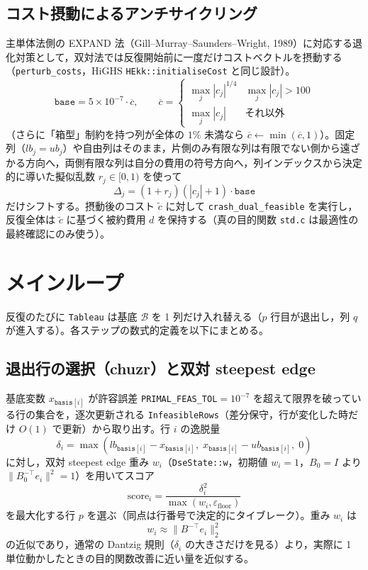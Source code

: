 \documentclass[11pt,a4paper]{ltjsarticle}
\newcommand{\code}[1]{\texttt{#1}}
\begin{document}
\subsection{コスト摂動によるアンチサイクリング}

主単体法側の EXPAND 法（Gill--Murray--Saunders--Wright, 1989）に対応する退化対策として，双対法では反復開始前に一度だけコストベクトルを摂動する（\code{perturb\_costs}，HiGHS \code{HEkk::initialiseCost} と同じ設計）。
\[
  \code{base} = 5\times 10^{-7}\cdot \overline{c}, \qquad
  \overline{c} = \begin{cases}\max_j|c_j|^{1/4} & \max_j|c_j| > 100\\ \max_j|c_j| & \text{それ以外}\end{cases}
\]
（さらに「箱型」制約を持つ列が全体の $1\%$ 未満なら $\overline c \leftarrow \min(\overline c, 1)$）。固定列（$lb_j=ub_j$）や自由列はそのまま，片側のみ有限な列は有限でない側から遠ざかる方向へ，両側有限な列は自分の費用の符号方向へ，列インデックスから決定的に導いた擬似乱数 $r_j \in [0,1)$ を使って
\[
  \Delta_j = (1+r_j)(|c_j|+1)\cdot\code{base}
\]
だけシフトする。摂動後のコスト $\tilde c$ に対して \code{crash\_dual\_feasible} を実行し，反復全体は $\tilde c$ に基づく被約費用 $d$ を保持する（真の目的関数 \code{std.c} は最適性の最終確認にのみ使う）。

\section{メインループ}

反復のたびに \code{Tableau} は基底 $\mathcal B$ を 1 列だけ入れ替える（$p$ 行目が退出し，列 $q$ が進入する）。各ステップの数式的定義を以下にまとめる。

\subsection{退出行の選択（chuzr）と双対 steepest edge}

基底変数 $x_{\code{basis}[i]}$ が許容誤差 \code{PRIMAL\_FEAS\_TOL}$=10^{-7}$ を超えて限界を破っている行の集合を，逐次更新される \code{InfeasibleRows}（差分保守，行が変化した時だけ $O(1)$ で更新）から取り出す。行 $i$ の逸脱量
\[
  \delta_i = \max(lb_{\code{basis}[i]} - x_{\code{basis}[i]},\; x_{\code{basis}[i]} - ub_{\code{basis}[i]},\; 0)
\]
に対し，双対 steepest edge 重み $w_i$（\code{DseState::w}，初期値 $w_i=1$，$B_0=I$ より $\lVert B_0^{-\top}e_i\rVert^2=1$）を用いてスコア
\[
  \mathrm{score}_i = \frac{\delta_i^2}{\max(w_i,\varepsilon_{\mathrm{floor}})}
\]
を最大化する行 $p$ を選ぶ（同点は行番号で決定的にタイブレーク）。重み $w_i$ は
\[
  w_i \approx \bigl\lVert B^{-\top} e_i \bigr\rVert_2^2
\]
の近似であり，通常の Dantzig 規則（$\delta_i$ の大きさだけを見る）より，実際に 1 単位動かしたときの目的関数改善に近い量を近似する。
\end{document}
